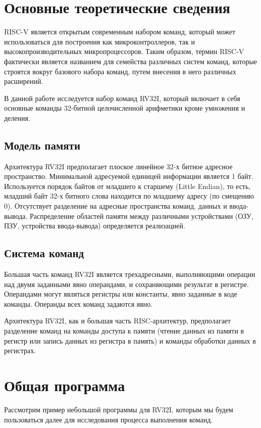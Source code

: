 \chapter{Основные теоретические сведения}
RISC-V является открытым современным набором команд, который может использоваться для построения как микроконтроллеров, так и высокопроизводительных микропроцессоров. Таким образом, термин RISC-V фактически является названием для семейства различных систем команд, которые строятся вокруг базового набора команд, путем внесения в него различных расширений.

В данной работе исследуется набор команд RV32I, который включает в себя основные команды 32-битной целочисленной арифметики кроме умножения и деления. 

\section{Модель памяти}
Архитектура RV32I предполагает плоское линейное 32-х битное адресное пространство. Минимальной адресуемой единицей информации является 1 байт. Используется порядок байтов от младшего к старшему (Little Endian), то есть, младший байт 32-х битного слова находится по младшему адресу (по смещению 0). Отсутствует разделение на адресные пространства команд, данных и ввода-вывода. Распределение областей памяти между различными устройствами (ОЗУ, ПЗУ, устройства ввода-вывода) определяется реализацией.

\section{Система команд}
Большая часть команд RV32I является трехадресными, выполняющими операции над двумя заданными явно операндами, и сохраняющими результат в регистре. Операндами могут являться регистры или константы, явно заданные в коде команды. Операнды всех команд задаются явно. 

Архитектура RV32I, как и большая часть RISC-архитектур, предполагает разделение команд на команды доступа к памяти (чтение данных из памяти в регистр или запись данных из регистра в память) и команды обработки данных в регистрах.

\chapter{Общая программа}

Рассмотрим пример небольшой программы для RV32I, которым мы будем пользоваться далее
для исследования процесса выполнения команд.

